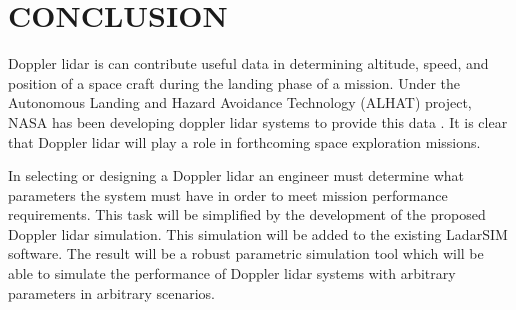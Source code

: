 \chapter{CONCLUSION}

Doppler lidar is can contribute useful data in determining altitude, speed, 
and position of a space craft during the landing phase of a mission. Under the
Autonomous Landing and Hazard Avoidance Technology (ALHAT) project, NASA has 
been developing doppler lidar systems to provide this data \cite{amz12fiber}. It is clear that
Doppler lidar will play a role in forthcoming space exploration missions. 

In selecting or designing a Doppler lidar an engineer must determine
what parameters the system must have in order to meet mission performance 
requirements. This task will be simplified by the development of the proposed
Doppler lidar simulation. This simulation will be added to 
the existing LadarSIM software. The result will be a robust parametric simulation
tool which will be able to simulate the performance of Doppler lidar systems with
arbitrary parameters in arbitrary scenarios.  

